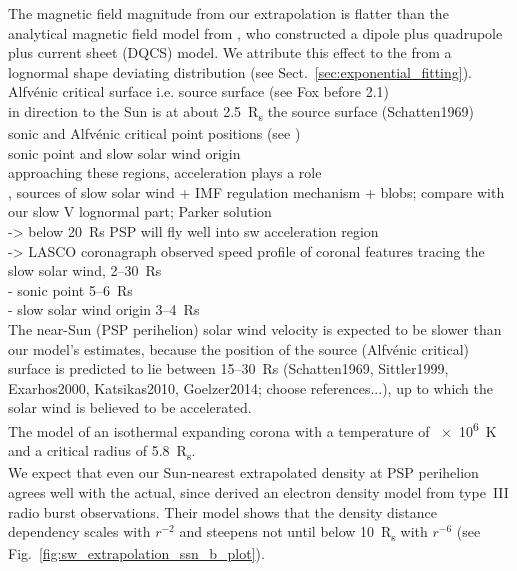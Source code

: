 The magnetic field magnitude from our extrapolation is flatter than the analytical magnetic field model from \citet{Banaszkiewicz1998}, who constructed a dipole plus quadrupole plus current sheet (DQCS) model. We attribute this effect to the from a lognormal shape deviating distribution (see Sect.~\ref{sec:exponential_fitting}).\\

Alfvénic critical surface i.e. source surface (see Fox before 2.1)\\
in direction to the Sun is at about \SI{2.5}{R_s} the source surface (Schatten1969)\\
sonic and Alfvénic critical point positions (see \citet{Sittler1999})\\
sonic point and slow solar wind origin \citep{Sheeley1997}\\
approaching these regions, acceleration plays a role\\

\citet{Wang2000}, sources of slow solar wind + IMF regulation mechanism + blobs; compare with our slow V lognormal part; Parker solution\\
-> below 20~Rs PSP will fly well into sw acceleration region\\

\citet{Sheeley1997} -> LASCO coronagraph observed speed profile of coronal features tracing the slow solar wind, 2--30~Rs\\
- sonic point 5--6~Rs\\
- slow solar wind origin 3--4~Rs\\

The near-Sun (PSP perihelion) solar wind velocity is expected to be slower than our model's estimates, because the position of the source (Alfvénic critical) surface is predicted to lie between 15--30~Rs (Schatten1969, Sittler1999, Exarhos2000, Katsikas2010, Goelzer2014; choose references...), up to which the solar wind is believed to be accelerated.\\
The \citet{Parker1958} model of an isothermal expanding corona with a temperature of \SI{e6}{\K} and a critical radius of \SI{5.8}{R_s}.\\

We expect that even our Sun-nearest extrapolated density at PSP perihelion agrees well with the actual, since \citet{Leblanc1998} derived an electron density model from type~III radio burst observations. Their model shows that the density distance dependency scales with $r^{-2}$ and steepens not until below \SI{10}{R_s} with $r^{-6}$ (see Fig.~\ref{fig:sw_extrapolation_ssn_b_plot}).\\

